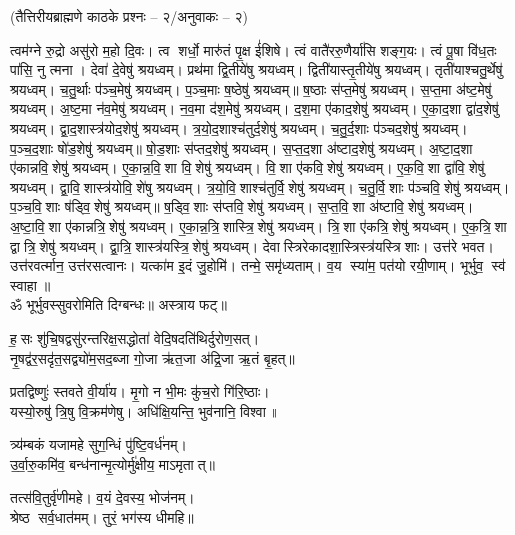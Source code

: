 \centerline{\normalsize (तैत्तिरीयब्राह्मणे काठके प्रश्नः – २/अनुवाकः – २)}
 त्वम॑ग्ने रु॒द्रो असु॑रो म॒हो दि॒वः। त्व शर्धो॒ मारु॑तं पृ॒क्ष ई॑शिषे।
 त्वं वातै॑ररु॒णैर्या॑सि शङ्ग॒यः। त्वं पू॒षा वि॑ध॒तः पा॑सि॒ नु त्मना।
 देवा॑ दे॒वेषु॑ श्रयध्वम्। प्रथ॑मा द्वि॒तीये॑षु श्रयध्वम्।
 द्विती॑यास्तृ॒तीये॑षु श्रयध्वम्। तृती॑याश्चतु॒र्थेषु॑ श्रयध्वम्।
 च॒तु॒र्थाः प॑ञ्च॒मेषु॑ श्रयध्वम्। प॒ञ्च॒माः ष॒ष्ठेषु॑ श्रयध्वम्॥
 ष॒ष्ठाः स॑प्त॒मेषु॑ श्रयध्वम्। स॒प्त॒मा अ॑ष्ट॒मेषु॑ श्रयध्वम्।
 अ॒ष्ट॒मा न॑व॒मेषु॑ श्रयध्वम्। न॒व॒मा द॑श॒मेषु॑ श्रयध्वम्।
 द॒श॒मा ए॑काद॒शेषु॑ श्रयध्वम्। ए॒का॒द॒शा द्वा॑द॒शेषु॑ श्रयध्वम्।
 द्वा॒द॒शास्त्र॑योद॒शेषु॑ श्रयध्वम्। त्र॒यो॒द॒शाश्च॑तुर्द॒शेषु॑ श्रयध्वम्।
 च॒तु॒र्द॒शाः प॑ञ्चद॒शेषु॑ श्रयध्वम्। प॒ञ्च॒द॒शाः षो॑ड॒शेषु॑ श्रयध्वम्॥
 षो॒ड॒शाः स॑प्तद॒शेषु॑ श्रयध्वम्। स॒प्त॒द॒शा अ॑ष्टाद॒शेषु॑ श्रयध्वम्। अ॒ष्टा॒द॒शा ए॑कान्नवि॒शेषु॑ श्रयध्वम्। ए॒का॒न्न॒वि॒शा वि॒शेषु॑ श्रयध्वम्। वि॒शा ए॑कवि॒शेषु॑ श्रयध्वम्। ए॒क॒वि॒शा द्वा॑वि॒शेषु॑ श्रयध्वम्। द्वा॒वि॒शास्त्र॑योवि॒शे॑षु श्रयध्वम्। त्र॒यो॒वि॒शाश्च॑तुर्वि॒शेषु॑ श्रयध्वम्। च॒तु॒र्वि॒शाः प॑ञ्चवि॒शेषु॑ श्रयध्वम्। प॒ञ्च॒वि॒शाः ष॑ड्वि॒शेषु॑ श्रयध्वम्॥
 ष॒ड्वि॒शाः स॑प्तवि॒शेषु॑ श्रयध्वम्। स॒प्त॒वि॒शा अ॑ष्टावि॒शेषु॑ श्रयध्वम्।
 अ॒ष्टा॒वि॒शा ए॑कान्नत्रि॒शेषु॑ श्रयध्वम्। ए॒का॒न्न॒त्रि॒शास्त्रि॒शेषु॑ श्रयध्वम्।
 त्रि॒शा ए॑कत्रि॒शेषु॑ श्रयध्वम्। ए॒क॒त्रि॒शा द्वात्रि॒शेषु॑ श्रयध्वम्।
 द्वा॒त्रि॒शास्त्र॑यस्त्रि॒शेषु॑ श्रयध्वम्। देवास्त्रिरेकादशा॒स्त्रिस्त्र॑यस्त्रिशाः।
 उत्त॑रे भवत। उत्त॑रवर्त्मान॒ उत्त॑रसत्वानः।
 यत्का॑म इ॒दं जु॒होमि॑। तन्मे॒ समृ॑ध्यताम्।
 व॒य स्या॑म॒ पत॑यो रयी॒णाम्। भूर्भुव॒ स्व॑ स्वाहा॥\\
ॐ भूर्भुवस्सुवरोमिति दिग्बन्धः॥ अस्त्राय फट्॥


ह॒सः शु॑चि॒षद्वसु॑रन्तरिक्ष॒सद्धोता॑ वेदि॒षदति॑थिर्दुरोण॒सत्।\\
नृ॒षद्व॑र॒सदृ॑त॒सद्व्यो॑म॒सद॒ब्जा गो॒जा ऋ॑त॒जा अ॑द्रि॒जा ऋ॒तं बृ॒हत्॥

प्रतद्विष्णुः॑ स्तवते वी॒र्या॑य। मृ॒गो न भी॒मः कु॑च॒रो गि॑रि॒ष्ठाः।\\
 यस्यो॒रुषु॑ त्रि॒षु वि॒क्रम॑णेषु। अधि॑क्षि॒यन्ति॒ भुव॑नानि॒ विश्वा॥

 त्र्य॑म्बकं यजामहे सुग॒न्धिं पु॑ष्टि॒वर्ध॑नम्।\\
 उ॒र्वा॒रु॒कमि॑व॒ बन्ध॑नान्मृ॒त्योर्मु॑क्षीय॒ माऽमृतात्॥ 

 तत्स॑वि॒तुर्वृ॑णीमहे। व॒यं दे॒वस्य॒ भोज॑नम्‌।\\
 श्रेष्ठ सर्व॒धात॑मम्‌। तुरं॒ भग॑स्य धीमहि॥ 

